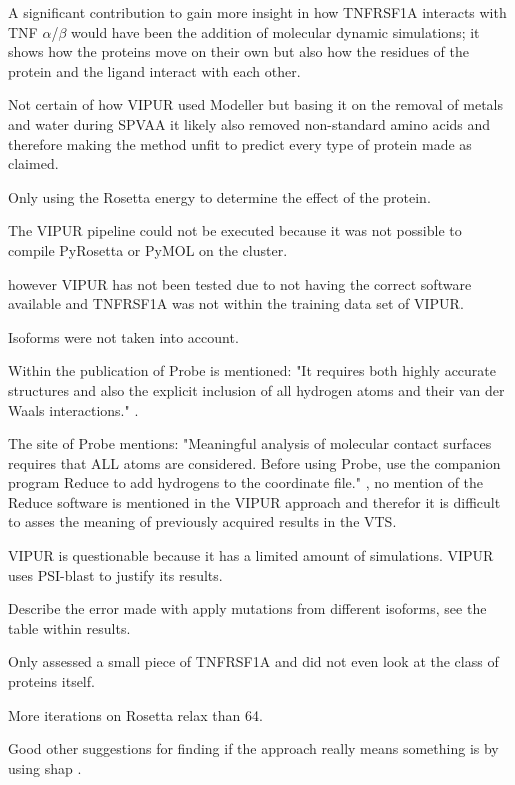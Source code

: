  A significant contribution to gain more insight in how TNFRSF1A interacts with TNF $\alpha$/$\beta$ would have been the addition of molecular dynamic simulations; it shows how the proteins move on their own but also how the residues of the protein and the ligand interact with each other.
 
 Not certain of how VIPUR used Modeller but basing it on the removal of metals and water during SPVAA it likely also removed non-standard amino acids and therefore making the method unfit to predict every type of protein made as claimed.

Only using the Rosetta energy to determine the effect of the protein.

The VIPUR pipeline could not be executed because it was not possible to compile PyRosetta or PyMOL on the cluster.

however VIPUR has not been tested due to not having the correct software available and TNFRSF1A was not within the training data set of VIPUR. 

Isoforms were not taken into account.

Within the publication of Probe is mentioned: "It requires both highly accurate structures and also the explicit inclusion of all hydrogen atoms and their van der Waals interactions." \cite{}.

The site of Probe mentions: "Meaningful analysis of molecular contact surfaces requires that ALL atoms are considered. Before using Probe, use the companion program Reduce to add hydrogens to the coordinate file." \cite{}, no mention of the Reduce software is mentioned in the VIPUR approach and therefor it is difficult to asses the meaning of previously acquired results in the VTS.

VIPUR is questionable because it has a limited amount of simulations.
VIPUR uses PSI-blast to justify its results.

Describe the error made with apply mutations from different isoforms, see the table within results.

Only assessed a small piece of TNFRSF1A and did not even look at the class of proteins itself.

More iterations on Rosetta relax than 64\cite{}.




Good other suggestions for finding if the approach really means something is by using shap \cite{}.

